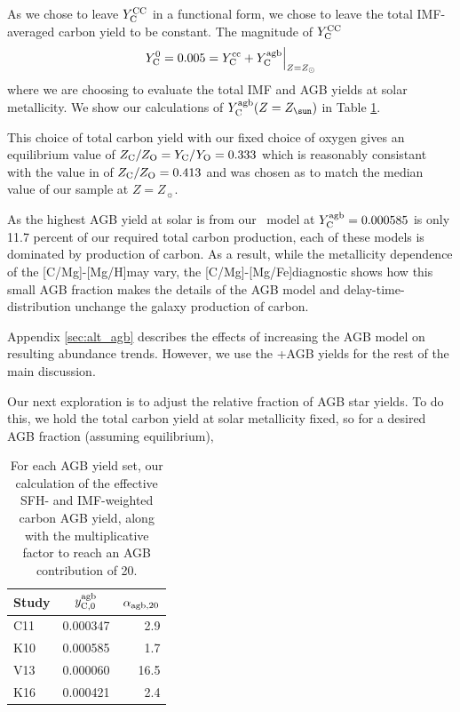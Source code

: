 \documentclass[fleqn,usenatbib]{mnras}
\newcommand{\cristallo}{\citetalias{cristallo+11}+\citetalias{cristallo+15}}
\newcommand{\karakas}{\citetalias{karakas10}}
\newcommand{\caah}{[C/Mg]-[Mg/H]}
\newcommand{\caafe}{[C/Mg]-[Mg/Fe]}
\begin{document}
As we chose to leave $Y_{\rm C}^{\rm CC}$ in a functional form, we chose to
leave the total IMF-averaged carbon yield to be constant. The magnitude of
$Y_{\rm C}^{\rm CC}$
\begin{equation}
    Y_{\rm C}^{0}  = 0.005  =  Y_{\rm C}^{\rm cc} + Y_{\rm C}^{\rm agb}
\Big \rvert_{Z=Z_\odot}
\end{equation}
where we are choosing to evaluate the total IMF \CC and AGB yields at solar
metallicity. We show our calculations of $Y_{\rm C}^{\rm agb}(Z=Z_{\sun })$  in
Table \ref{tab:alpha_agb}. 

This choice of total carbon yield with our fixed choice of oxygen gives an
equilibrium value of $Z_{\rm C}/Z_{\rm O} = Y_{\rm C}/Y_{\rm O} = 0.333$ which
is reasonably consistant with the value in \citet{asplund+09} of $Z_{\rm
C}/Z_{\rm O}=0.413$ and was chosen as to match the median value of our sample
at $Z=Z_{\sun }$. 

As the highest AGB yield at solar is from our \karakas~model at $Y_{\rm C}^{\rm
agb} = 0.000585$ is only 11.7 percent of our required total carbon production,
each of these models is dominated by \CC production of carbon. As a result,
while the metallicity dependence of the \caah may vary, the
\caafe diagnostic shows how this small AGB fraction makes the details of
the AGB model and delay-time-distribution unchange the galaxy production of
carbon. 

Appendix \ref{sec:alt_agb} describes the effects of increasing the AGB model on
resulting abundance trends. However, we use the \cristallo AGB yields for the
rest of the main discussion.

Our next exploration is to adjust the relative fraction of AGB star yields. To do this, we hold the total carbon yield at solar metallicity fixed, so for a desired AGB fraction (assuming equilibrium), 


\begin{table}
	\centering
	\caption{For each AGB yield set, our calculation of the effective SFH- and IMF-weighted carbon AGB yield, along with the multiplicative factor to reach an AGB contribution of 20.}
	\label{tab:alpha_agb}
	\begin{tabular}{lcr} %
		\hline
		Study & $y_{\rm C, 0}^{\rm agb}$ & $\alpha_{\rm agb, 20}$\\
		\hline
		C11 & 0.000347 & 2.9\\
		K10 & 0.000585 & 1.7\\
		V13 & 0.000060 & 16.5\\
		K16 & 0.000421 & 2.4\\
		\hline
	\end{tabular}
\end{table}
\end{document}
